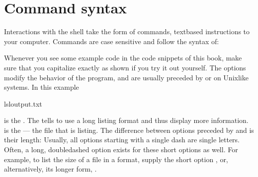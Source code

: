 \section{Command syntax}
\label{\detokenize{intro/howto:command-syntax}}
\sphinxAtStartPar
Interactions with the shell take the form of commands, text\sphinxhyphen{}based instructions to your computer.
Commands are case sensitive and follow the syntax of:

\begin{sphinxVerbatim}[commandchars=\\\{\}]
 \PYG{p}{[}\PYG{p}{]} 
\end{sphinxVerbatim}

\sphinxAtStartPar
Whenever you see some example code in the code snippets of this book, make sure
that you capitalize exactly as shown if you try it out yourself.
The options modify the behavior of the program, and are usually preceded by \sphinxcode{\sphinxupquote{\sphinxhyphen{}}} or \sphinxcode{\sphinxupquote{\sphinxhyphen{}\sphinxhyphen{}}} on Unix\sphinxhyphen{}like systems.
In this example

\ignorespaces 
\def\sphinxLiteralBlockLabel{\label{\detokenize{intro/howto:index-1}}}
\begin{sphinxVerbatim}[commandchars=\\\{\}]
ls\PYGZhy{}loutput.txt
\end{sphinxVerbatim}

\sphinxAtStartPar
{} is the . The   tells  to use a long listing format and
thus display more information.
 is the  — the file that  is listing.
The difference between options preceded by \sphinxcode{\sphinxupquote{\sphinxhyphen{}}} and \sphinxcode{\sphinxupquote{\sphinxhyphen{}\sphinxhyphen{}}} is their length:
Usually, all options starting with a single dash are single letters. Often,
a long, double\sphinxhyphen{}dashed option exists for these short options as well. For example,
to list the size of a file in a  format, supply the short option
, or, alternatively, its longer form, .

